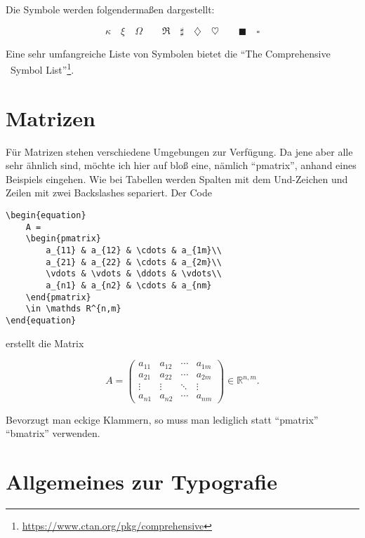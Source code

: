 Die Symbole werden folgendermaßen dargestellt:

\begin{equation}
	\kappa \quad \xi \quad \Omega
	\qquad
	\Re \quad \sharp \quad \diamondsuit \quad \heartsuit
	\qquad
	\blacksquare \quad \square 
\end{equation}

Eine sehr umfangreiche Liste von Symbolen bietet die \enquote{The Comprehensive \DMLLaTeX \ Symbol List}\footnote{\href{https://www.ctan.org/pkg/comprehensive}{https://www.ctan.org/pkg/comprehensive}}.

\section{Matrizen}
Für Matrizen stehen verschiedene Umgebungen zur Verfügung. Da jene aber alle sehr ähnlich sind, möchte ich hier auf bloß eine, nämlich \enquote{pmatrix}, anhand eines Beispiels eingehen. Wie bei Tabellen werden Spalten mit dem Und-Zeichen und Zeilen mit zwei Backslashes separiert.
Der Code
\begin{lstlisting}
\begin{equation}
	A =
	\begin{pmatrix}
		a_{11} & a_{12} & \cdots & a_{1m}\\
		a_{21} & a_{22} & \cdots & a_{2m}\\
		\vdots & \vdots & \ddots & \vdots\\
		a_{n1} & a_{n2} & \cdots & a_{nm}
	\end{pmatrix}
	\in \mathds R^{n,m}
\end{equation}
\end{lstlisting} 

erstellt die Matrix

\begin{equation}
	A =
	\begin{pmatrix}
		a_{11} & a_{12} & \cdots & a_{1m}\\
		a_{21} & a_{22} & \cdots & a_{2m}\\
		\vdots & \vdots & \ddots & \vdots\\
		a_{n1} & a_{n2} & \cdots & a_{nm}
	\end{pmatrix}
	\in \mathds R^{n,m}.
\end{equation}

Bevorzugt man eckige Klammern, so muss man lediglich statt \enquote{pmatrix} \enquote{bmatrix} verwenden.

\section{Allgemeines zur Typografie}
